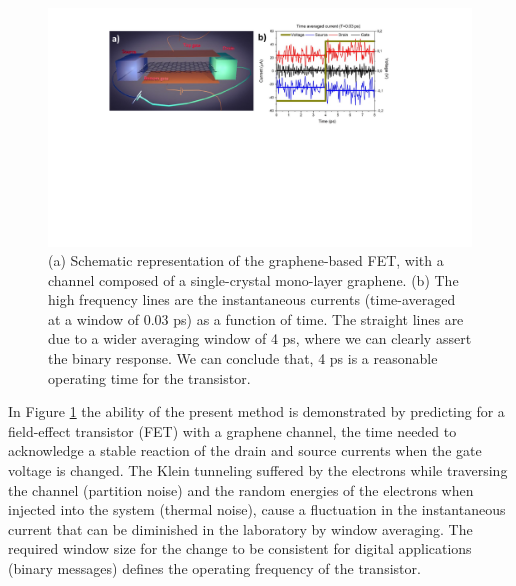 \documentclass[11pt, a4paper]{article} %
\begin{document}
\begin{figure}[h!]
  \centering
  \hspace*{-0.3cm}
   \includegraphics[width=0.71\linewidth]{Figures/figurefinal.pdf}\vspace{-0.3cm}
   \caption{(a) Schematic representation of the graphene-based FET, with a channel composed of a single-crystal mono-layer graphene. (b) The high frequency lines are the instantaneous currents (time-averaged at a window of $0.03$ ps) as a function of time. The straight lines are due to a wider averaging window of 4 ps, where we can clearly assert the binary response. We can conclude that, 4 ps is a reasonable operating time for the transistor.}
  \label{fig:fig}
\end{figure}

In Figure \ref{fig:fig} the ability of the present method is demonstrated \cite{inject,Thz} by predicting for a field-effect transistor (FET) with a graphene channel, the time needed to acknowledge a stable reaction of the drain and source currents when the gate voltage is changed. The Klein tunneling suffered by the electrons while traversing the channel (partition noise) and the random energies of the electrons when injected into the system (thermal noise), cause a fluctuation in the instantaneous current that can be diminished in the laboratory by window averaging. The required window size for the change to be consistent for digital applications (binary messages) defines the operating frequency of the transistor.\vspace{-0.25cm}


\end{document}
